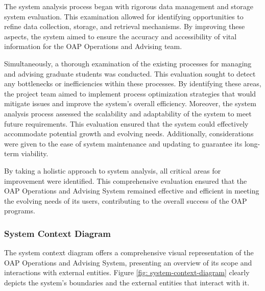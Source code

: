\documentclass[12pt]{article}
\begin{document}
The system analysis process began with rigorous data management and storage system evaluation. This examination allowed for identifying opportunities to refine data collection, storage, and retrieval mechanisms. By improving these aspects, the system aimed to ensure the accuracy and accessibility of vital information for the OAP Operations and Advising team.

Simultaneously, a thorough examination of the existing processes for managing and advising graduate students was conducted. This evaluation sought to detect any bottlenecks or inefficiencies within these processes. By identifying these areas, the project team aimed to implement process optimization strategies that would mitigate issues and improve the system's overall efficiency. Moreover, the system analysis process assessed the scalability and adaptability of the system to meet future requirements. This evaluation ensured that the system could effectively accommodate potential growth and evolving needs. Additionally, considerations were given to the ease of system maintenance and updating to guarantee its long-term viability.

By taking a holistic approach to system analysis, all critical areas for improvement were identified. This comprehensive evaluation ensured that the OAP Operations and Advising System remained effective and efficient in meeting the evolving needs of its users, contributing to the overall success of the OAP programs.

\subsubsection{System Context Diagram}
The system context diagram offers a comprehensive visual representation of the OAP Operations and Advising System, presenting an overview of its scope and interactions with external entities. Figure \ref{fig: system-context-diagram} clearly depicts the system's boundaries and the external entities that interact with it.
\end{document}
